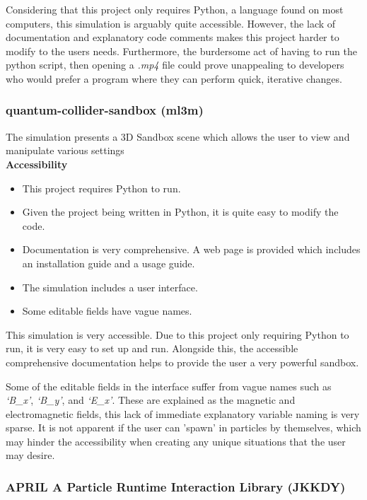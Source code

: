 Considering that this project only requires Python, a language found on most computers, this simulation is arguably quite accessible. However, the lack of documentation and explanatory code comments makes this project harder to modify to the users needs.
Furthermore, the burdersome act of having to run the python script, then opening a \textit{.mp4} file could prove unappealing to developers who would prefer a program where they can perform quick, iterative changes.

\subsubsection*{quantum-collider-sandbox (ml3m)}

The simulation  presents a 3D Sandbox scene which allows the user to view and manipulate various settings
\\
\textbf{Accessibility}

\begin{itemize}
    \item This project requires Python to run.
    \item Given the project being written in Python, it is quite easy to modify the code.
    \item Documentation is very comprehensive. A web page is provided which includes an installation guide and a usage guide.
    \item The simulation includes a user interface.
    \item Some editable fields have vague names.
\end{itemize}

This simulation is very accessible.
Due to this project only requiring Python to run, it is very easy to set up and run. Alongside this, the accessible comprehensive documentation helps to provide the user a very powerful sandbox.

Some of the editable fields in the interface suffer from vague names such as \textit{`B\_x'}, \textit{`B\_y'}, and \textit{`E\_x'}. These are explained as the magnetic and electromagnetic fields, this lack of immediate explanatory variable naming is very sparse.
It is not apparent if the user can 'spawn' in particles by themselves, which may hinder the accessibility when creating any unique situations that the user may desire.

\subsubsection*{APRIL \- A Particle Runtime Interaction Library (JKKDY)}

